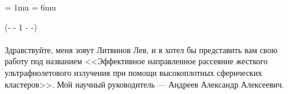 \documentclass[11pt]{article}
\begin{document}



	\pagestyle{empty}
	\fancyhf{}
	\fancyhead[L]{\textit{\nouppercase{\leftmark}}}
	\fancyfoot[C]{\thepage}

	\thinmuskip = 1mu
	\thickmuskip = 6mu

	\renewcommand{\equationautorefname}{}



	\noindent(- - 1 - -)\\~\\
	Здравствуйте, меня зовут Литвинов Лев, и я хотел бы представить вам свою работу под названием <<Эффективное направленное рассеяние жесткого ультрафиолетового излучения при помощи высокоплотных сферических кластеров>>. Мой научный руководитель --- Андреев Александр Алексеевич.

	
	
	
	

\end{document}
